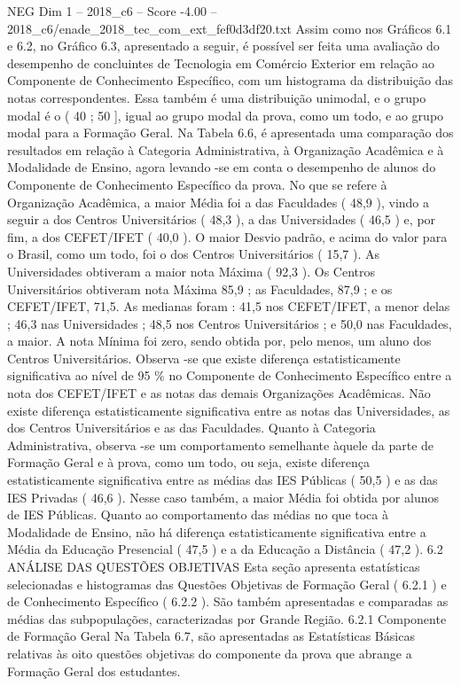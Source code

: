 \begin{textsample}{NEG Dim 1 – 2018\_c6 – Score -4.00 – 2018\_c6/enade\_2018\_tec\_com\_ext\_fef0d3df20.txt}
Assim como nos Gráficos 6.1 e 6.2, no Gráfico 6.3, apresentado a seguir, é possível ser feita uma avaliação do desempenho de concluintes de Tecnologia em Comércio Exterior em relação ao Componente de Conhecimento Específico, com um histograma da distribuição das notas correspondentes.
Essa também é uma distribuição unimodal, e o grupo modal é o ( 40 ; 50 ], igual ao grupo modal da prova, como um todo, e ao grupo modal para a Formação Geral.
Na Tabela 6.6, é apresentada uma comparação dos resultados em relação à Categoria Administrativa, à Organização Acadêmica e à Modalidade de Ensino, agora levando -se em conta o desempenho de alunos do Componente de Conhecimento Específico da prova.
No que se refere à Organização Acadêmica, a maior Média foi a das Faculdades ( 48,9 ), vindo a seguir a dos Centros Universitários ( 48,3 ), a das Universidades ( 46,5 ) e, por fim, a dos CEFET/IFET ( 40,0 ).
O maior Desvio padrão, e acima do valor para o Brasil, como um todo, foi o dos Centros Universitários ( 15,7 ).
As Universidades obtiveram a maior nota Máxima ( 92,3 ).
Os Centros Universitários obtiveram nota Máxima 85,9 ; as Faculdades, 87,9 ; e os CEFET/IFET, 71,5.
As medianas foram : 41,5 nos CEFET/IFET, a menor delas ; 46,3 nas Universidades ; 48,5 nos Centros Universitários ; e 50,0 nas Faculdades, a maior.
A nota Mínima foi zero, sendo obtida por, pelo menos, um aluno dos Centros Universitários.
Observa -se que existe diferença estatisticamente significativa ao nível de 95 \% no Componente de Conhecimento Específico entre a nota dos CEFET/IFET e as notas das demais Organizações Acadêmicas.
Não existe diferença estatisticamente significativa entre as notas das Universidades, as dos Centros Universitários e as das Faculdades.
Quanto à Categoria Administrativa, observa -se um comportamento semelhante àquele da parte de Formação Geral e à prova, como um todo, ou seja, existe diferença estatisticamente significativa entre as médias das IES Públicas ( 50,5 ) e as das IES Privadas ( 46,6 ).
Nesse caso também, a maior Média foi obtida por alunos de IES Públicas.
Quanto ao comportamento das médias no que toca à Modalidade de Ensino, não há diferença estatisticamente significativa entre a Média da Educação Presencial ( 47,5 ) e a da Educação a Distância ( 47,2 ). 6.2 ANÁLISE DAS QUESTÕES OBJETIVAS Esta seção apresenta estatísticas selecionadas e histogramas das Questões Objetivas de Formação Geral ( 6.2.1 ) e de Conhecimento Específico ( 6.2.2 ).
São também apresentadas e comparadas as médias das subpopulações, caracterizadas por Grande Região. 6.2.1 Componente de Formação Geral Na Tabela 6.7, são apresentadas as Estatísticas Básicas relativas às oito questões objetivas do componente da prova que abrange a Formação Geral dos estudantes.

\end{textsample}
